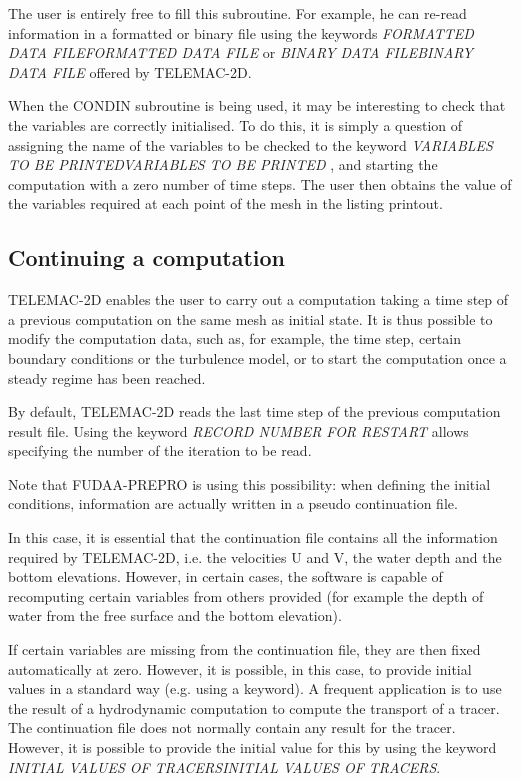  The user is entirely free to fill this subroutine. For example, he can re-read information in a formatted or binary file using the keywords \textit{FORMATTED DATA FILEFORMATTED DATA FILE} or \textit{BINARY DATA FILEBINARY DATA FILE} offered by TELEMAC-2D.

 When the CONDIN subroutine is being used, it may be interesting to check that the variables are correctly initialised. To do this, it is simply a question of assigning the name of the variables to be checked to the keyword \textit{VARIABLES TO BE PRINTEDVARIABLES TO BE PRINTED} , and starting the computation with a zero number of time steps. The user then obtains the value of the variables required at each point of the mesh in the listing printout.


\subsection{ Continuing a computation}

 TELEMAC-2D enables the user to carry out a computation taking a time step of a previous computation on the same mesh as initial state. It is thus possible to modify the computation data, such as, for example, the time step, certain boundary conditions or the turbulence model, or to start the computation once a steady regime has been reached.

 By default, TELEMAC-2D reads the last time step of the previous computation result file. Using the keyword \textit{RECORD NUMBER FOR RESTART} allows specifying the number of the iteration to be read.

 Note that FUDAA-PREPRO is using this possibility: when defining the initial conditions, information are actually written in a pseudo continuation file.

 In this case, it is essential that the continuation file contains all the information required by TELEMAC-2D, i.e. the velocities U and V, the water depth and the bottom elevations. However, in certain cases, the software is capable of recomputing certain variables from others provided (for example the depth of water from the free surface and the bottom elevation).

 If certain variables are missing from the continuation file, they are then fixed automatically at zero. However, it is possible, in this case, to provide initial values in a standard way (e.g. using a keyword). A frequent application is to use the result of a hydrodynamic computation to compute the transport of a tracer. The continuation file does not normally contain any result for the tracer. However, it is possible to provide the initial value for this by using the keyword \textit{INITIAL VALUES OF TRACERSINITIAL VALUES OF TRACERS}.

